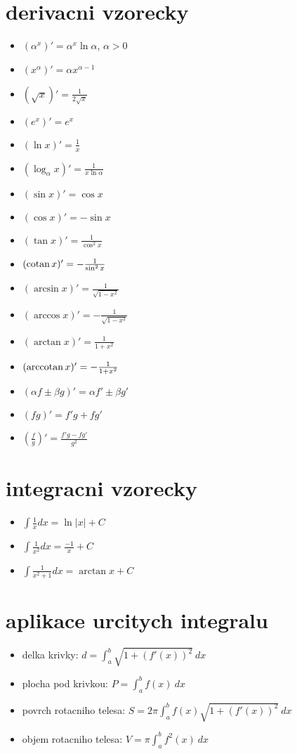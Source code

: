 \documentclass[a4paper]{article}
\def\cotan{\qopname\relax o{cotan}}
\def\arccotan{\qopname\relax o{arccotan}}
\begin{document}
\section*{derivacni vzorecky}
\begin{itemize}
	\item $(\alpha^x)' = \alpha^x\ln \alpha$, $\alpha>0$
	\item $(x^\alpha)' = \alpha x^{\alpha-1}$
	\item $(\sqrt{x})' = \frac{1}{2\sqrt{x}}$
	\item $(e^x)' = e^x$
	\item $(\ln x)' = \frac{1}{x}$
	\item $(\log_\alpha x)' = \frac{1}{x\ln \alpha}$
	\item $(\sin x)' = \cos x$
	\item $(\cos x)' = -\sin x$
	\item $(\tan x)' = \frac{1}{\cos^2 x}$
	\item $(\cotan x)' = -\frac{1}{\sin^2 x}$
	\item $(\arcsin x)' = \frac{1}{\sqrt{1-x^2}}$
	\item $(\arccos x)' = -\frac{1}{\sqrt{1-x^2}}$
	\item $(\arctan x)' = \frac{1}{1+x^2}$
	\item $(\arccotan x)' = -\frac{1}{1+x^2}$
\end{itemize}

\begin{itemize}
	\item $(\alpha f \pm \beta g)' = \alpha f' \pm \beta g'$
	\item $(fg)' = f'g + fg'$
	\item $(\frac{f}{g})' = \frac{f'g-fg'}{g^2}$
\end{itemize}

\section*{integracni vzorecky}
\begin{itemize}
	\item $\int \frac{1}{x} dx = \ln |x| + C$
	\item $\int \frac{1}{x^2} dx = \frac{-1}{x} + C$
	\item $\int \frac{1}{x^2+1} dx = \arctan x + C$
\end{itemize}

\section*{aplikace urcitych integralu}
\begin{itemize}
	\item delka krivky: $d=\int_a^b\sqrt{1+(f'(x))^2} ~dx$
	\item plocha pod krivkou: $P=\int_a^b f(x) ~dx$
	\item povrch rotacniho telesa: $S=2\pi \int_a^b f(x) \sqrt{1+(f'(x))^2} ~dx$
	\item objem rotacniho telesa: $V=\pi \int_a^b f^2(x) ~dx$
\end{itemize}
\end{document}
